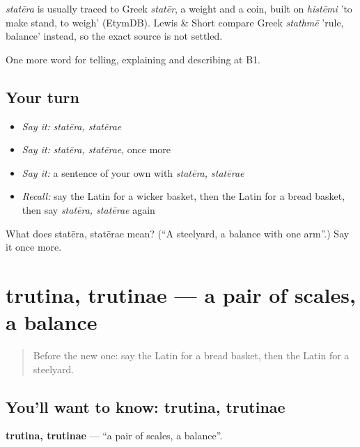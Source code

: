 \begin{cousinweb}
\emph{statēra} is usually traced to Greek \emph{statēr}, a weight and a coin, built on \emph{histēmi} 'to make stand, to weigh' (EtymDB). Lewis \& Short compare Greek \emph{stathmē} 'rule, balance' instead, so the exact source is not settled.
\end{cousinweb}

\begin{grammarlens}[title={What you've built}]
One more word for telling, explaining and describing at B1.
\end{grammarlens}

\subsection*{Your turn}
\begin{itemize}
\raggedright
  \item \emph{Say it:} \emph{statēra, statērae}
  \item \emph{Say it:} \emph{statēra, statērae}, once more
  \item \emph{Say it:} a sentence of your own with \emph{statēra, statērae}
  \item \emph{Recall:} say the Latin for a wicker basket, then the Latin for a bread basket, then say \emph{statēra, statērae} again
\end{itemize}

\begin{tcolorbox}[breakable,colback=teal!4,colframe=teal!35!black,title={Before you move on}]
What does statēra, statērae mean? (\textquotedblleft{}A steelyard, a balance with one arm\textquotedblright{}.) Say it once more.
\end{tcolorbox}
\section[trutina, trutinae]{trutina, trutinae — a pair of scales, a balance}

\label{lesson:LA-C464-trutina}



\begin{quote}
Before the new one: say the Latin for a bread basket, then the Latin for a steelyard.
\end{quote}

\subsection*{You'll want to know: trutina, trutinae}
\textbf{trutina, trutinae} — \textquotedblleft{}a pair of scales, a balance\textquotedblright{}.

